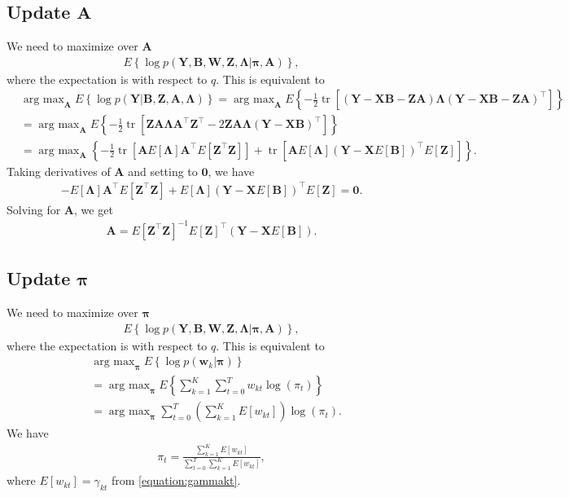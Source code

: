 \documentclass[11pt,authoryear]{article}
\DeclareMathOperator*{\tr}{tr}
\DeclareMathOperator*{\argmax}{arg\ max}
\newcommand{\bs}[1]{\boldsymbol{#1}}
\begin{document}
\subsection{Update $\bs{A}$}
We need to maximize over $\bs{A}$
\begin{align}
E\left\{\log p(\bs{Y},\bs{B},\bs{W},\bs{Z},\bs{\Lambda}|\bs{\pi},\bs{A})\right\},
\end{align}
where the expectation is with respect to $q$. This is equivalent to
\begin{align}
&\argmax_{\bs{A}}E\left\{\log p(\bs{Y}|\bs{B}, \bs{Z}, \bs{A}, \bs{\Lambda})\right\} = \argmax_{\bs{A}}E\left\{-\frac{1}{2}\tr\left[(\bs{Y}-\bs{X}\bs{B}-\bs{Z}\bs{A})\bs{\Lambda}(\bs{Y}-\bs{X}\bs{B} - \bs{Z}\bs{A})^{\intercal}\right]\right\}\\
&=\argmax_{\bs{A}}E\left\{-\frac{1}{2}\tr\left[\bs{Z}\bs{A}\bs{\Lambda}\bs{A}^{\intercal}\bs{Z}^{\intercal} - 2 \bs{Z}\bs{A}\bs{\Lambda}(\bs{Y} - \bs{X}\bs{B})^{\intercal}\right]\right\}\\
&=\argmax_{\bs{A}}\left\{-\frac{1}{2}\tr\left[\bs{A}E\left[\bs{\Lambda}\right]\bs{A}^{\intercal}E\left[\bs{Z}^{\intercal}\bs{Z}\right]\right] + \tr\left[\bs{A}E\left[\bs{\Lambda}\right](\bs{Y} - \bs{X}E\left[\bs{B}\right])^{\intercal}E\left[\bs{Z}\right]\right]\right\}.
\end{align}
Taking derivatives of $\bs{A}$ and setting to $\bs{0}$, we have
\begin{align}
-E\left[\bs{\Lambda}\right]\bs{A}^{\intercal}E\left[\bs{Z}^{\intercal}\bs{Z}\right] + E\left[\bs{\Lambda}\right](\bs{Y} - \bs{X}E\left[\bs{B}\right])^{\intercal}E\left[\bs{Z}\right] = \bs{0}.
\end{align}
Solving for $\bs{A}$, we get
\begin{align}
\bs{A} = E\left[\bs{Z}^{\intercal}\bs{Z}\right]^{-1} E\left[\bs{Z}\right]^{\intercal}(\bs{Y} - \bs{X}E\left[\bs{B}\right]).
\end{align}

\subsection{Update $\bs{\pi}$}
We need to maximize over $\bs{\pi}$
\begin{align}
E\left\{\log p(\bs{Y},\bs{B},\bs{W},\bs{Z},\bs{\Lambda}|\bs{\pi},\bs{A})\right\},
\end{align}
where the expectation is with respect to $q$. This is equivalent to
\begin{align}
&\argmax_{\bs{\pi}} E\left\{\log p(\bs{w}_k|\bs{\pi})\right\}\\
&=\argmax_{\bs{\pi}} E\left\{\sum_{k = 1}^K\sum_{t = 0}^Tw_{kt}\log(\pi_t)\right\}\\
&=\argmax_{\bs{\pi}} \sum_{t = 0}^T\left(\sum_{k = 1}^KE[w_{kt}]\right)\log(\pi_t).
\end{align}
We have
\begin{align}
\pi_t = \frac{\sum_{k = 1}^KE[w_{kt}]}{\sum_{t = 0}^T\sum_{k = 1}^KE[w_{kt}]},
\end{align}
where $E[w_{kt}] = \gamma_{kt}$ from \eqref{equation:gammakt}.
\end{document}
